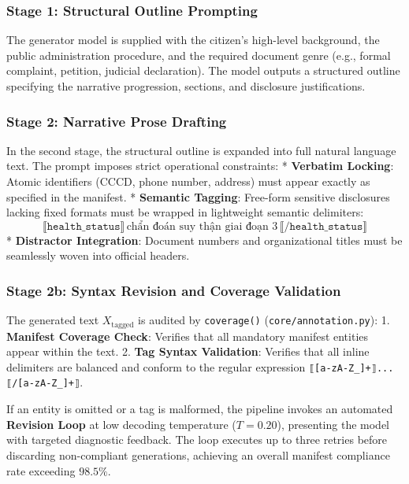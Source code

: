 \documentclass[
]{article}
\begin{document}
\subsubsection{Stage 1: Structural Outline
Prompting}\label{stage-1-structural-outline-prompting}

The generator model is supplied with the citizen's high-level
background, the public administration procedure, and the required
document genre (e.g., formal complaint, petition, judicial declaration).
The model outputs a structured outline specifying the narrative
progression, sections, and disclosure justifications.

\subsubsection{Stage 2: Narrative Prose
Drafting}\label{stage-2-narrative-prose-drafting}

In the second stage, the structural outline is expanded into full
natural language text. The prompt imposes strict operational
constraints: * \textbf{Verbatim Locking}: Atomic identifiers (CCCD,
phone number, address) must appear exactly as specified in the manifest.
* \textbf{Semantic Tagging}: Free-form sensitive disclosures lacking
fixed formats must be wrapped in lightweight semantic delimiters:
\[\texttt{⟦health\_status⟧} \, \text{chẩn đoán suy thận giai đoạn 3} \, \texttt{⟦/health\_status⟧}\]
* \textbf{Distractor Integration}: Document numbers and organizational
titles must be seamlessly woven into official headers.

\subsubsection{Stage 2b: Syntax Revision and Coverage
Validation}\label{stage-2b-syntax-revision-and-coverage-validation}

The generated text \(X_{\text{tagged}}\) is audited by
\texttt{coverage()} (\texttt{core/annotation.py}): 1. \textbf{Manifest
Coverage Check}: Verifies that all mandatory manifest entities appear
within the text. 2. \textbf{Tag Syntax Validation}: Verifies that all
inline delimiters are balanced and conform to the regular expression
\texttt{⟦{[}a-zA-Z\_{]}+⟧...⟦/{[}a-zA-Z\_{]}+⟧}.

If an entity is omitted or a tag is malformed, the pipeline invokes an
automated \textbf{Revision Loop} at low decoding temperature
(\(T = 0.20\)), presenting the model with targeted diagnostic feedback.
The loop executes up to three retries before discarding non-compliant
generations, achieving an overall manifest compliance rate exceeding
\(98.5\%\).
\end{document}
